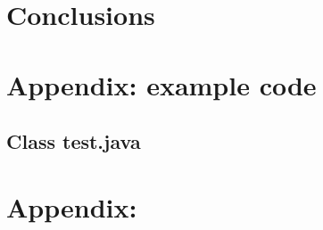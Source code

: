 \documentclass[letterpaper,twocolumn,10pt]{article}
\begin{document}

\section{Conclusions}

\cite{pelillo} 






\vfill
\break


\onecolumn
\appendix
\label{app:appendixA}
\lstset{language=Python}  
\section{Appendix: example code}

\subsection{Class test.java}


\label{app:appendixB}
\section{Appendix:}


\end{document}
